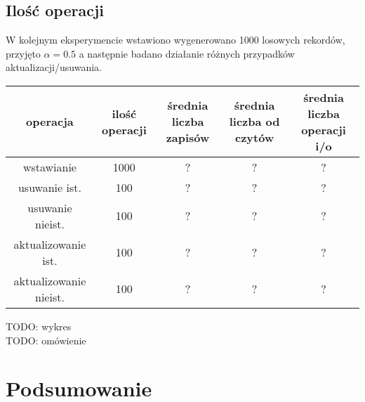 \documentclass{article}
\begin{document}
\subsection{Ilość operacji}
W kolejnym eksperymencie wstawiono wygenerowano 1000 losowych rekordów, przyjęto $\alpha=0.5$ a następnie badano działanie różnych przypadków aktualizacji/usuwania.
\begin{center}
\begin{tabular}{ c c | c c | c}
 operacja & ilość operacji & średnia liczba zapisów & średnia liczba od czytów & średnia liczba operacji i/o \\ 
\hline
 wstawianie & 1000 & ? & ? & ? \\  
 usuwanie ist. & 100 & ? & ? & ? \\
 usuwanie nieist. & 100 & ? & ? & ? \\
 aktualizowanie ist. & 100 & ? & ? & ?\\
 aktualizowanie nieist. & 100 & ? & ?  & ?\\
\end{tabular}
\end{center}
TODO: wykres \\
TODO: omówienie
\section{Podsumowanie}
\end{document}
